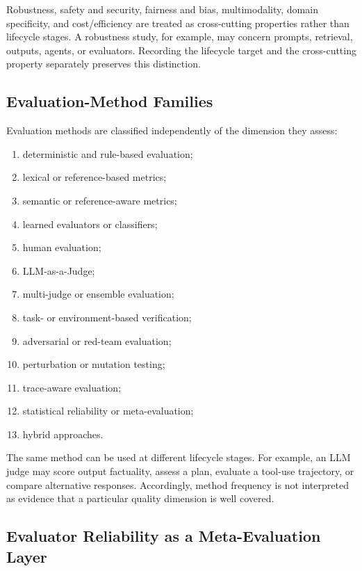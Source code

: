 Robustness, safety and security, fairness and bias, multimodality, domain specificity, and cost/efficiency are treated as cross-cutting properties rather than lifecycle stages. A robustness study, for example, may concern prompts, retrieval, outputs, agents, or evaluators. Recording the lifecycle target and the cross-cutting property separately preserves this distinction.

\subsection{Evaluation-Method Families}

Evaluation methods are classified independently of the dimension they assess:

\begin{enumerate}
    \item deterministic and rule-based evaluation;
    \item lexical or reference-based metrics;
    \item semantic or reference-aware metrics;
    \item learned evaluators or classifiers;
    \item human evaluation;
    \item LLM-as-a-Judge;
    \item multi-judge or ensemble evaluation;
    \item task- or environment-based verification;
    \item adversarial or red-team evaluation;
    \item perturbation or mutation testing;
    \item trace-aware evaluation;
    \item statistical reliability or meta-evaluation;
    \item hybrid approaches.
\end{enumerate}

The same method can be used at different lifecycle stages. For example, an LLM judge may score output factuality, assess a plan, evaluate a tool-use trajectory, or compare alternative responses. Accordingly, method frequency is not interpreted as evidence that a particular quality dimension is well covered.

\subsection{Evaluator Reliability as a Meta-Evaluation Layer}

